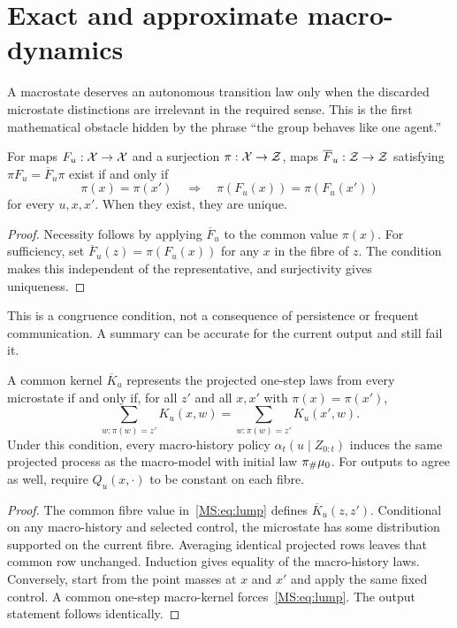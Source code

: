 \section{Exact and approximate macro-dynamics}\label{MS:sec:closure}
A macrostate deserves an autonomous transition law only when the discarded microstate distinctions are irrelevant in the required sense. This is the first mathematical obstacle hidden by the phrase ``the group behaves like one agent.''

\begin{MSproposition}\label{MS:prop:det}
For maps $F_u:\mathcal X\to\mathcal X$ and a surjection $\pi:\mathcal X\to\mathcal Z$, maps $\overline F_u:\mathcal Z\to\mathcal Z$ satisfying $\pi F_u=\overline F_u\pi$ exist if and only if
\[
\pi(x)=\pi(x')\quad\Longrightarrow\quad
\pi(F_u(x))=\pi(F_u(x'))
\]
for every $u,x,x'$. When they exist, they are unique.
\end{MSproposition}
\begin{proof}
Necessity follows by applying $\overline F_u$ to the common value $\pi(x)$. For sufficiency, set $\overline F_u(z)=\pi(F_u(x))$ for any $x$ in the fibre of $z$. The condition makes this independent of the representative, and surjectivity gives uniqueness.
\end{proof}

This is a congruence condition, not a consequence of persistence or frequent communication. A summary can be accurate for the current output and still fail it.

\begin{MSproposition}\label{MS:prop:lump}
A common kernel $\overline K_u$ represents the projected one-step laws from every microstate if and only if, for all $z'$ and all $x,x'$ with $\pi(x)=\pi(x')$,
\begin{equation}\label{MS:eq:lump}
\sum_{w:\pi(w)=z'}K_u(x,w)
=\sum_{w:\pi(w)=z'}K_u(x',w).
\end{equation}
Under this condition, every macro-history policy $\alpha_t(u\mid Z_{0:t})$ induces the same projected process as the macro-model with initial law $\pi_{\#}\mu_0$. For outputs to agree as well, require $Q_u(x,\cdot)$ to be constant on each fibre.
\end{MSproposition}
\begin{proof}
The common fibre value in~\eqref{MS:eq:lump} defines $\overline K_u(z,z')$. Conditional on any macro-history and selected control, the microstate has some distribution supported on the current fibre. Averaging identical projected rows leaves that common row unchanged. Induction gives equality of the macro-history laws. Conversely, start from the point masses at $x$ and $x'$ and apply the same fixed control. A common one-step macro-kernel forces~\eqref{MS:eq:lump}. The output statement follows identically.
\end{proof}

